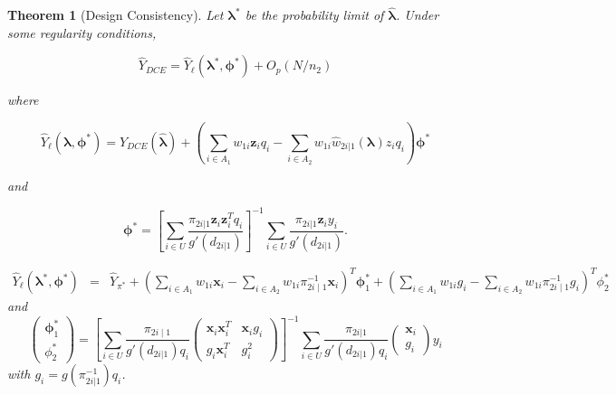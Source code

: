 \documentclass[12pt]{article}
\newtheorem{theorem}{Theorem}
\newcommand{\bx}{\mathbf{x}}
\renewcommand{\bf}[1]{\mathbf{#1}}
\begin{document}
\begin{theorem}[Design Consistency]\label{thm:dc1}
  Let $\bm \lambda^*$ be the probability limit of $\hat{\bm \lambda}$.
  Under some regularity conditions,

  $$\hat Y_{DCE} = \hat Y_\ell(\bm \lambda^*, \bm \phi^*) + O_p(N / n_2)$$

  where

  $$\hat Y_{\ell}(\bm \lambda, \bm \phi^*) = \hat Y_{DCE}(\hat{\bm \lambda}) + 
  \left(\sum_{i \in A_1} w_{1i} \bf z_i q_i - \sum_{i \in A_2} w_{1i} \hat w_{2i|1}(
  \bm \lambda) z_i q_i\right)\bm \phi^*$$

  and

  $$\bm \phi^* = 
  \left[\sum_{i \in U} \frac{\pi_{2i|1}\bf z_i \bf z_i^T q_i}{g'(d_{2i|1})}\right]^{-1}
  \sum_{i \in U} \frac{\pi_{2i|1}\bf z_i y_i}{g'(d_{2i|1})}.$$

   \begin{eqnarray*}
   \hat Y_{\ell}(\bm \lambda^*, \bm \phi^*) &=&   \hat{Y}_{\pi^*} + 
  \left(\sum_{i \in A_1} w_{1i} \bf x_i  -  \sum_{i \in A_2} w_{1i} \pi_{2i \mid
  1}^{-1} \bf x_i  \right)^T \bm \phi_1^* + \left(\sum_{i \in A_1} w_{1i} g_i  -
  \sum_{i \in A_2} w_{1i} \pi_{2i \mid 1}^{-1}g_i  \right)^T \phi_2^*  
  \end{eqnarray*} 
  and  $$\begin{pmatrix}
  \bm \phi_1^* \\
  \phi_2^* 
  \end{pmatrix}
  = \left[ \sum_{i \in U} \frac{\pi_{2i \mid 1} }{ g'(d_{2i|1}) q_i} 
  \begin{pmatrix}
  \bx_i \bx_i^T &   \bx_i g_i   \\
  g_i  \bx_i^T   & g_i^2     \end{pmatrix} \right]^{-1}
  \sum_{i \in U} \frac{\pi_{2i|1}}{ g'(d_{2i | 1}) q_i} \begin{pmatrix}
    \bx_i \\ g_i 
  \end{pmatrix}y_i $$
with $g_i = g( \pi_{2i |1}^{-1}) q_i$.
\end{theorem}
\end{document}
